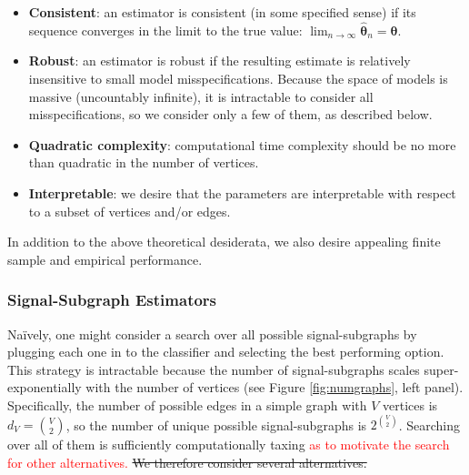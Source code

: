 \documentclass[10pt,journal,cspaper,compsoc]{IEEEtran}
\providecommand{\tr}[1]{\textcolor{red}{#1}}
\providecommand{\ve}[1]{\boldsymbol{#1}}
\newcommand{\bth}{\ve{\theta}}
\newcommand{\bhth}{\wh{\ve{\theta}}}
\providecommand{\mc}[1]{\mathcal{#1}}
\providecommand{\wh}[1]{\widehat{#1}}
\newcommand{\conv}{\rightarrow}
\begin{document}
\begin{itemize}
	\item \textbf{Consistent}: an estimator is consistent (in some specified sense) if its sequence converges in the limit to the true value: $\lim_{n \conv \infty} \bhth_n = \bth$.  %
	\item \textbf{Robust}: an estimator is robust if the resulting estimate is relatively insensitive to small model misspecifications.  Because the space of models is massive (uncountably infinite), it is intractable to consider all misspecifications, so we consider only a few of them, as described below.
	\item \textbf{Quadratic complexity}: computational time complexity should be no more than quadratic in the number of vertices.
	\item \textbf{Interpretable}: we desire that the parameters are interpretable with respect to a subset of vertices and/or edges.
\end{itemize}
In addition to the above theoretical desiderata, we also desire appealing finite sample and empirical performance.


\subsubsection{Signal-Subgraph Estimators} %
\label{ssub:subsubsection_name1}


Na\"{i}vely, one might consider a search over all possible signal-subgraphs by plugging each one in to the classifier and selecting the best performing option.  This strategy is intractable because the number of signal-subgraphs scales super-exponentially with the number of vertices (see Figure \ref{fig:numgraphs}, left panel). Specifically, the number of possible edges in a simple graph with $V$ vertices is $d_V=\binom{V}{2}$, so the number of unique possible signal-subgraphs is $2^{\binom{V}{2}}$.  Searching over all of them is sufficiently computationally taxing %
\tr{as to motivate the search for other alternatives.}
\sout{We therefore consider several alternatives.}
\end{document}
